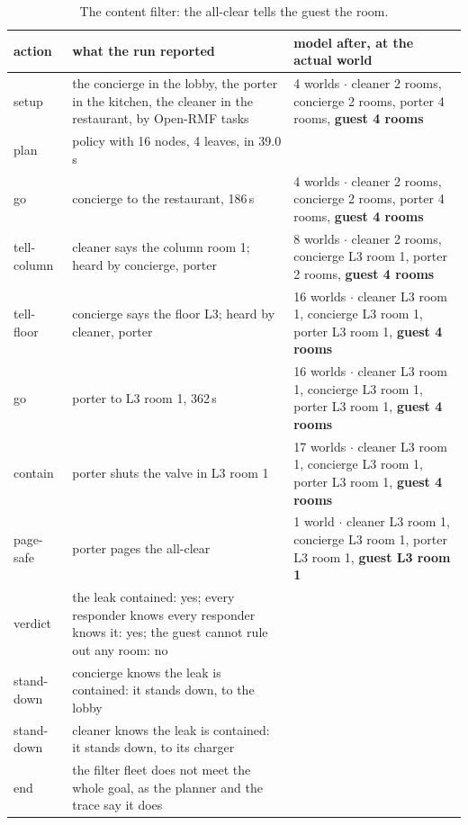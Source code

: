\documentclass[11pt,a4paper]{article}
\theoremstyle{definition}
\begin{document}
\begin{table}[H]
\centering\scriptsize
\begin{tabularx}{\textwidth}{@{}l X X@{}}
\toprule
action & what the run reported & model after, at the actual world \\
\midrule
setup & the concierge in the lobby, the porter in the kitchen, the cleaner in the restaurant, by Open-RMF tasks & 4 worlds $\cdot$ cleaner 2 rooms, concierge 2 rooms, porter 4 rooms, \textbf{guest 4 rooms} \\
plan & policy with 16 nodes, 4 leaves, in 39.0 s &  \\
go & concierge to the restaurant, 186\,s & 4 worlds $\cdot$ cleaner 2 rooms, concierge 2 rooms, porter 4 rooms, \textbf{guest 4 rooms} \\
tell-column & cleaner says the column room 1; heard by concierge, porter & 8 worlds $\cdot$ cleaner 2 rooms, concierge L3 room 1, porter 2 rooms, \textbf{guest 4 rooms} \\
tell-floor & concierge says the floor L3; heard by cleaner, porter & 16 worlds $\cdot$ cleaner L3 room 1, concierge L3 room 1, porter L3 room 1, \textbf{guest 4 rooms} \\
go & porter to L3 room 1, 362\,s & 16 worlds $\cdot$ cleaner L3 room 1, concierge L3 room 1, porter L3 room 1, \textbf{guest 4 rooms} \\
contain & porter shuts the valve in L3 room 1 & 17 worlds $\cdot$ cleaner L3 room 1, concierge L3 room 1, porter L3 room 1, \textbf{guest 4 rooms} \\
page-safe & porter pages the all-clear & 1 world $\cdot$ cleaner L3 room 1, concierge L3 room 1, porter L3 room 1, \textbf{guest L3 room 1} \\
verdict & the leak contained: yes; every responder knows every responder knows it: yes; the guest cannot rule out any room: no &  \\
stand-down & concierge knows the leak is contained: it stands down, to the lobby &  \\
stand-down & cleaner knows the leak is contained: it stands down, to its charger &  \\
end & the filter fleet does not meet the whole goal, as the planner and the trace say it does &  \\
\bottomrule
\end{tabularx}
\caption{The content filter: the all-clear tells the guest the room.}
\label{tab:run-filter}
\end{table}
\end{document}
